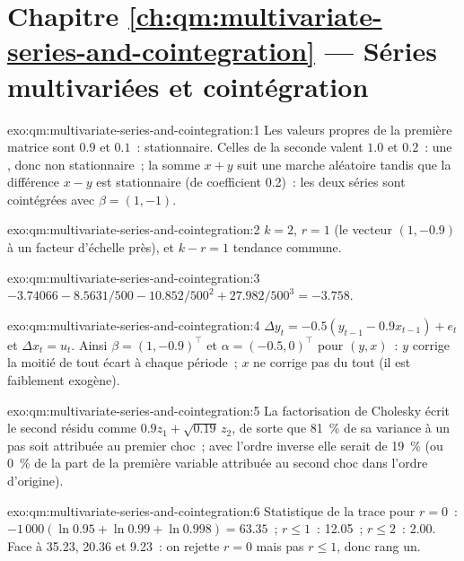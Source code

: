 \section*{Chapitre \ref{ch:qm:multivariate-series-and-cointegration} --- Séries multivariées et cointégration}

\begin{solution}{exo:qm:multivariate-series-and-cointegration:1}
Les valeurs propres de la première matrice sont $0.9$ et $0.1$~: stationnaire. Celles de la seconde valent $1.0$ et $0.2$~: une , donc non stationnaire~; la somme $x + y$
suit une marche aléatoire tandis que la différence $x - y$ est stationnaire (de coefficient 0.2)~: les deux séries sont cointégrées avec $\beta = (1, -1)$.
\end{solution}

\begin{solution}{exo:qm:multivariate-series-and-cointegration:2}
$k = 2$, $r = 1$ (le vecteur $(1, -0.9)$ à un facteur d'échelle près), et $k - r = 1$ tendance commune.
\end{solution}

\begin{solution}{exo:qm:multivariate-series-and-cointegration:3}
$-3.74066 - 8.5631/500 - 10.852/500^2 + 27.982/500^3 = -3.758$.
\end{solution}

\begin{solution}{exo:qm:multivariate-series-and-cointegration:4}
$\Delta y_t = -0.5(y_{t-1} - 0.9x_{t-1}) + e_t$ et $\Delta x_t = u_t$. Ainsi $\beta = (1, -0.9)^\top$ et $\alpha = (-0.5, 0)^\top$ pour $(y, x)$~: $y$ corrige la moitié de tout écart
à chaque période~; $x$ ne corrige pas du tout (il est faiblement exogène).
\end{solution}

\begin{solution}{exo:qm:multivariate-series-and-cointegration:5}
La factorisation de Cholesky écrit le second résidu comme $0.9z_1 + \sqrt{0.19}\,z_2$, de sorte que 81~\% de sa variance à un pas soit attribuée au premier choc~; avec l'ordre inverse
elle serait de 19~\% (ou 0~\% de la part de la première variable attribuée au second choc dans l'ordre d'origine).
\end{solution}

\begin{solution}{exo:qm:multivariate-series-and-cointegration:6}
Statistique de la trace pour $r = 0$~: $-1\,000(\ln0.95 + \ln0.99 + \ln0.998) = 63.35$~; $r \le 1$~: 12.05~; $r \le 2$~: 2.00. Face à 35.23, 20.36 et 9.23~: on rejette $r = 0$ mais pas $r \le 1$, donc rang un.
\end{solution}

